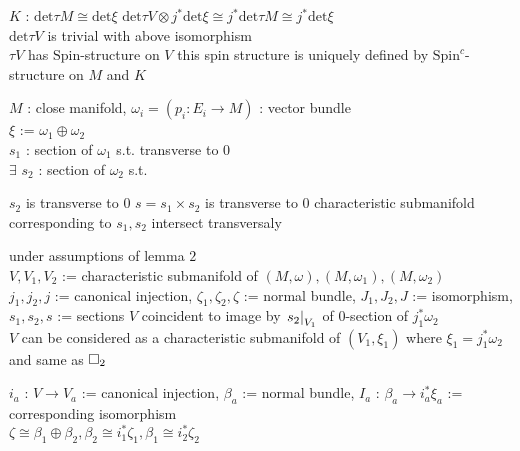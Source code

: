 \documentclass[dvipdfmx]{jsarticle}
\begin{document}
\begin{Theorem}
\itemwhen 
  \For \(K\) : \(\text{det} \tau M \cong \text{det} \xi\)
\itemprop
  \Then \(\text{det} \tau V \otimes j^* \text{det} \xi \cong j^* \text{det} \tau M \cong j^* \text{det} \xi\) \\
  \Then \(\text{det} \tau V\) is trivial with above isomorphism \\
  \Then \(\tau V\) has \(\text{Spin}\)-structure on \(V\)
\itemprop
  \Then this spin structure is uniquely defined by \(\text{Spin}^c\)-structure on \(M\) and \(K\)
\end{Theorem}

\begin{Theorem}
\itemwhen
  \For \(M\) : close manifold, \(\omega_i = (p_i : E_i \to M)\) : vector bundle \\
  \Let \(\xi\) := \(\omega_1 \oplus \omega_2\) \\
  \For \(s_1\) : section of \(\omega_1\) s.t. transverse to \(0\) \\
\itemprop
  \Then \(\exists\) \(s_2\) : section of \(\omega_2\) s.t.
  \begin{itemize}
    \itemenum \(s_2\) is transverse to \(0\)
    \itemenum \(s = s_1 \times s_2\) is transverse to \(0\)
    \itemenum characteristic submanifold corresponding to \(s_1, s_2\) intersect transversaly
  \end{itemize}
\end{Theorem}

\begin{Theorem}
\itemwhen
  \For under assumptions of lemma \(2\) \\
  \Let \(V,V_1,V_2\) := characteristic submanifold of \((M, \omega), (M, \omega_1), (M, \omega_2)\) \\
  \Let \(j_1,j_2,j\) := canonical injection, \(\zeta_1,\zeta_2, \zeta\) := normal bundle, \(J_1,J_2,J\) := isomorphism, \(s_1,s_2,s\) := sections
\itemprop
  \Then \(V\) coincident to image by \(\left. {s_2} \right| _{V_1}\) of \(0\)-section of \(j_1^* \omega_2\) \\
  \Then \(V\) can be considered as a characteristic submanifold of \((V_1,\xi_1)\) where \(\xi_1 = j_1^*\omega_2\) and same as \(\square_2\) \\
\end{Theorem}

\begin{Theorem}
\itemwhen
  \Let \(i_a\) : \(V \to V_a\) := canonical injection, \(\beta_a\) := normal bundle, \(I_a\) : \(\beta_a \to i_a^*\xi_a\) := corresponding isomorphism \\
\itemwhen
  \Then \(\zeta \cong \beta_1 \oplus \beta_2, \beta_2 \cong i_1^* \zeta_1, \beta_1 \cong i_2^* \zeta_2\) \\

\end{Theorem}
\end{document}
